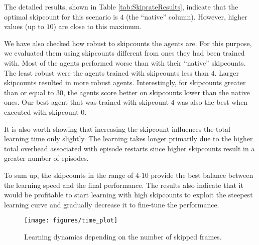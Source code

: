 \documentclass[english,american,conference, balance]{IEEEtran}
\begin{document}
The detailed results, shown in Table \ref{tab:SkiprateResults}, indicate
that the optimal skipcount for this scenario is $4$ (the ``native''
column). However, higher values (up to $10$) are close to this maximum. 

We have also checked how robust to skipcounts the agents are. For
this purpose, we evaluated them using skipcounts different from ones
they had been trained with. Most of the agents performed worse than
with their ``native'' skipcounts. The least robust were the agents
trained with skipcounts less than $4$. Larger skipcounts resulted
in more robust agents. Interestingly, for skipcounts greater than
or equal to $30$, the agents score better on skipcounts lower than
the native ones. Our best agent that was trained with skipcount $4$
was also the best when executed with skipcount $0$. 

It is also worth showing that increasing the skipcount influences
the total learning time only slightly. The learning takes longer primarily
due to the higher total overhead associated with episode restarts
since higher skipcounts result in a greater number of episodes.

To sum up, the skipcounts in the range of $4$-$10$ provide the best
balance between the learning speed and the final performance. The
results also indicate that it would be profitable to start learning
with high skipcounts to exploit the steepest learning curve and gradually
decrease it to fine-tune the performance.

\begin{figure}
\begin{centering}
\texttt{[image: figures/time\_plot]} 
\par\end{centering}
\centering{}\caption{\label{fig:skiprate_time}Learning dynamics depending on the number
of skipped frames.}
\end{figure}
\end{document}
